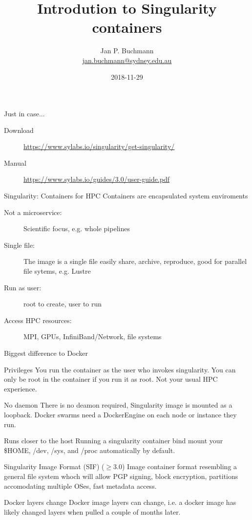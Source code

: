 \documentclass{beamer}
\title[]{Introdution to Singularity containers}
\subtitle{}
\author[]{Jan P. Buchmann\\\small{\href{mailto:jan.buchmann@sydney.edu.au}{jan.buchmann@sydney.edu.au}}}
\institute{The University Of Sydney}
\date{2018-11-29}
\begin{document}
  \titlepage

  \begin{frame}{Just in case...}
    \begin{description}
      \item[Download] \url{https://www.sylabs.io/singularity/get-singularity/}
      \item[Manual] \url{https://www.sylabs.io/guides/3.0/user-guide.pdf}
    \end{description}
  \end{frame}

  \begin{frame}{Singularity: Containers for HPC}
   Containers are encapsulated system enviroments
    \begin{description}
      \item[Not a microservice:]Scientific focus, e.g. whole pipelines
      \item[Single file:] The image is a single file easily share, archive,
                          reproduce, good for parallel file sytems, e.g. Lustre
      \item[Run as user:] root to create, user to run
      \item[Access HPC resources:] MPI, GPUs, InfiniBand/Network, file systems
    \end{description}
  \end{frame}


  \begin{frame}{Biggest difference to Docker}
    \begin{block}{Privileges}
      You run the container as the user who invokes singularity. You can only
      be root in the container if you run it as root. Not your usual HPC
      experience.
    \end{block}
    \begin{block}{No daemon}
      There is no deamon required, Singularity image is mounted as a loopback.
      Docker swarms need a DockerEngine on each  node or instance they run.
    \end{block}
    \begin{block}{Runs closer to the host}
      Running a singularity container bind mount your \$HOME, /dev, /sys, and
      /proc automatically by default.
    \end{block}
    \begin{block}{Singularity Image Format (SIF) ($\geq$3.0)}
      Image container format resembling a general file system whoch will allow
      PGP signing, block encryption, partitions accomodating multiple OSes,
      fast metadata access.
    \end{block}
    \begin{block}{Docker layers change}
      Docker image layers can change, i.e. a docker image has likely changed
      layers when pulled a couple of months later.
    \end{block}
  \end{frame}
\end{document}
